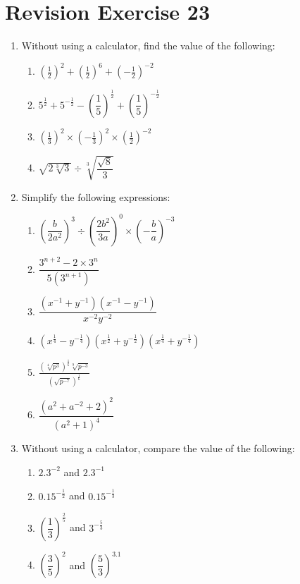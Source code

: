 \documentclass[12pt]{report}
\begin{document}
\newpage
\section*{Revision Exercise 23}
\begin{enumerate}
    \item Without using a calculator, find the value of the following:
          \begin{enumerate}
              \item ${\left({\frac{1}{2}}\right)}^{2}+{\left({\frac{1}{2}}\right)}^{6}+{\left(-{\frac{1}{2}}\right)}^{-2}$
              \item $5^{\frac{1}{2}}+5^{-{\frac{1}{2}}}-{\left(\dfrac{1}{5}\right)}^{\frac{1}{2}}+{\left(\dfrac{1}{5}\right)}^{-{\frac{1}{2}}}$
              \item ${\left({\frac{1}{3}}\right)}^{2}\times{\left(-{\frac{1}{3}}\right)}^{2}\times{\left({\frac{1}{2}}\right)}^{-2}$
              \item ${\sqrt{2{\sqrt[3]{3}}}}\div{\sqrt[3]{\dfrac{\sqrt{8}}{3}}}$
          \end{enumerate}

    \item Simplify the following expressions:
          \begin{enumerate}
              \item ${\left({\dfrac{b}{2a^{2}}}\right)}^{3}\div{\left({\dfrac{2b^{2}}{3a}}\right)}^{0}\times{\left(-{\dfrac{b}{a}}\right)}^{-3}$
              \item $\dfrac{3^{n+2}-2\times3^{n}}{5(3^{n+1})}$
              \item $\dfrac{\left(x^{-1}+y^{-1}\right)\left(x^{-1}-y^{-1}\right)}{x^{-2}y^{-2}}$
              \item $\left({x^{\frac{1}{4}}}-y^{-{\frac{1}{4}}}\right)\left(x^{\frac{1}{2}}+y^{-{\frac{1}{2}}}\right)\left(x^{\frac{1}{4}}+y^{-{\frac{1}{4}}}\right)$
              \item $\frac{{\left({\sqrt[4]{p^{3}}}\right)}^{\frac{1}{6}}{\sqrt[9]{p^{-3}}}}{{\left(\sqrt{p^{-7}}\right)}^{\frac{1}{6}}}$
              \item $\dfrac{{\left(a^{2}+a^{-2}+2\right)}^{2}}{{\left(a^{2}+1\right)}^{4}}$
          \end{enumerate}

    \item Without using a calculator, compare the value of the following:
          \begin{enumerate}
              \item $2.3^{-2}$ and $2.3^{-1}$
              \item $0.15^{-{\frac{1}{2}}}$ and ${0.15}^{-{\frac{1}{3}}}$
              \item ${\left({\dfrac{1}{3}}\right)}^{\frac{2}{5}}$ and $ 3^{-{\frac{5}{3}}}$
              \item ${\left({\dfrac{3}{5}}\right)}^{2}$ and ${\left({\dfrac{5}{3}}\right)}^{3.1}$
          \end{enumerate}


\end{enumerate}
\end{document}
